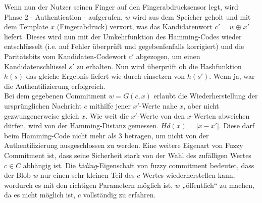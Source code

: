 \documentclass[12pt,a4paper]{article}
\begin{document}
Wenn nun der Nutzer seinen Finger auf den Fingerabdrucksensor legt, wird Phase 2 - Authentication - aufgerufen. $w$ wird aus dem Speicher geholt und mit dem Template $x$ (Fingerabdruck) verxort, was das Kandidatenwort $c' = w \oplus x'$ liefert. Dieses wird nun mit der Umkehrfunktion des Hamming-Codes wieder entschlüsselt (i.e. auf Fehler überprüft und gegebenfenfalls korrigiert) und die Paritätsbits vom Kandidaten-Codewort $c'$ abgezogen, um einen Kandidatenschlüssel $s'$ zu erhalten. Nun wird überprüft ob die Hashfunktion $h(s)$ das gleiche Ergebnis liefert wie durch einsetzen von $h(s')$. Wenn ja, war die Authentifizierung erfolgreich. \\

Bei dem gegebenen Commitment $w = G(c,x)$ erlaubt die Wiederherstellung der ursprünglichen Nachricht $c$ mithilfe jener $x'$-Werte nahe $x$, aber nicht gezwungenerweise gleich $x$. Wie weit die $x'$-Werte von den $x$-Werten abweichen dürfen, wird von der Hamming-Distanz gemessen.  $Hd(x) = |x - x'|$. Diese darf beim Hamming-Code nicht mehr als 3 betragen, um nicht von der Authentifizierung ausgeschlossen zu werden. Eine weitere Eigenart von Fuzzy Commitment ist, dass seine Sicherheit stark von der Wahl des zufälligen Wertes $c\in C$ abhängig ist. Die \textit{hiding}-Eigenschaft von fuzzy commitment bedeutet, dass der Blob $w$ nur einen sehr kleinen Teil des $c$-Wertes wiederherstellen kann, wordurch es mit den richtigen Parametern möglich ist, $w$ „öffentlich“ zu machen, da es nicht möglich ist, $c$ vollständig zu erfahren.
\end{document}
